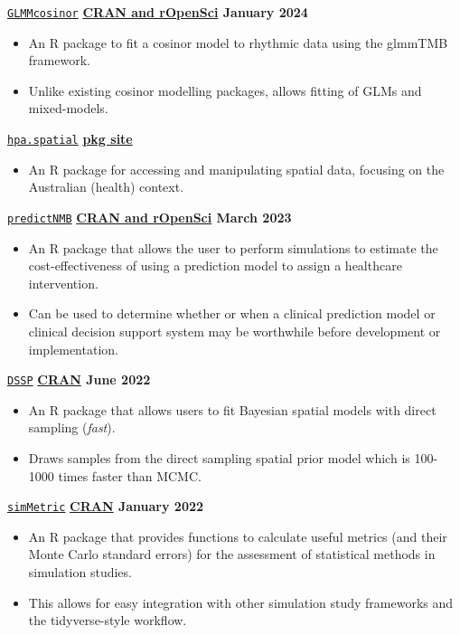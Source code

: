 \texttt{\href{https://github.com/ropensci/GLMMcosinor}{GLMMcosinor}} \hfill \textbf{\href{https://docs.ropensci.org/GLMMcosinor}{CRAN and rOpenSci} January 2024} \par
\begin{itemize}
    \item An R package to fit a cosinor model to rhythmic data using the glmmTMB framework. 
    \item Unlike existing cosinor modelling packages, allows fitting of GLMs and mixed-models.
\end{itemize}

\texttt{\href{https://github.com/healthpolicyanalysis/hpa.spatial}{hpa.spatial}} \hfill \textbf{\href{https://healthpolicyanalysis.github.io/hpa.spatial/}{pkg site}} \par
\begin{itemize}
    \item An R package for accessing and manipulating spatial data, focusing on the Australian (health) context.
\end{itemize}

\texttt{\href{https://github.com/ropensci/predictNMB}{predictNMB}} \hfill \textbf{\href{https://docs.ropensci.org/predictNMB/}{CRAN and rOpenSci} March 2023} \par
\begin{itemize}
    \item An R package that allows the user to perform simulations to estimate the cost-effectiveness of using a prediction model to assign a healthcare intervention.
    \item Can be used to determine whether or when a clinical prediction model or clinical decision support system may be worthwhile before development or implementation.
\end{itemize}

\texttt{\href{https://github.com/gentrywhite/DSSP}{DSSP}} \hfill \textbf{\href{https://cran.r-project.org/package=DSSP}{CRAN} June 2022} \par
\begin{itemize}
    \item An R package that allows users to fit Bayesian spatial models with direct sampling (\textit{fast}).
    \item Draws samples from the direct sampling spatial prior model which is 100-1000 times faster than MCMC.
\end{itemize}

\texttt{\href{https://github.com/RWParsons/simMetric}{simMetric}} \hfill \textbf{\href{https://cran.r-project.org/package=simMetric}{CRAN}  January 2022} \par
\begin{itemize}
    \item An R package that provides functions to calculate useful metrics (and their Monte Carlo standard errors) for the assessment of statistical methods in simulation studies.
    \item This allows for easy integration with other simulation study frameworks and the tidyverse-style workflow.
\end{itemize}

